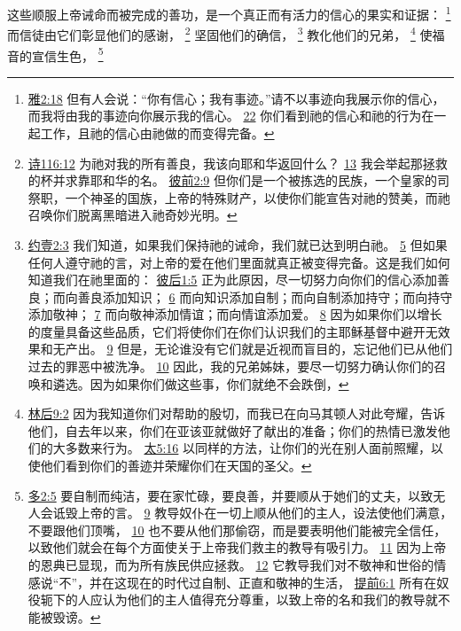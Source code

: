 \documentclass[12pt, a4paper, oneside]{ctexart}
\newcounter{parnum}[section]
\newcommand{\N}{%
   \noindent\refstepcounter{parnum}%
    \makebox[\parindent][l]{\textbf{\arabic{parnum}.}}}
\begin{document}
\N 这些顺服上帝诫命而被完成的善功，是一个真正而有活力的信心的果实和证据：
	\footnote {
		\href{https://biblehub.com/james/2-18.htm}{雅2:18} 但有人会说：“你有信心；我有事迹。”请不以事迹向我展示你的信心，而我将由我的事迹向你展示我的信心。
		\href{https://biblehub.com/james/2-22.htm}{22} 你们看到祂的信心和祂的行为在一起工作，且祂的信心由祂做的而变得完备。
	}
	而信徒由它们彰显他们的感谢，
	\footnote {
		\href{https://biblehub.com/psalms/116-12.htm}{诗116:12} 为祂对我的所有善良，我该向耶和华返回什么？
		\href{https://biblehub.com/psalms/116-13.htm}{13} 我会举起那拯救的杯并求靠耶和华的名。
		\href{https://biblehub.com/1_peter/2-9.htm}{彼前2:9} 但你们是一个被拣选的民族，一个皇家的司祭职，一个神圣的国族，上帝的特殊财产，以使你们能宣告对祂的赞美，而祂召唤你们脱离黑暗进入祂奇妙光明。
	}
	坚固他们的确信，
	\footnote {
		\href{https://biblehub.com/1_john/2-3.htm}{约壹2:3} 我们知道，如果我们保持祂的诫命，我们就已达到明白祂。
		\href{https://biblehub.com/1_john/2-5.htm}{5} 但如果任何人遵守祂的言，对上帝的爱在他们里面就真正被变得完备。这是我们如何知道我们在祂里面的：
		\href{https://biblehub.com/2_peter/1-5.htm}{彼后1:5} 正为此原因，尽一切努力向你们的信心添加善良；而向善良添加知识；
		\href{https://biblehub.com/2_peter/1-6.htm}{6} 而向知识添加自制；而向自制添加持守；而向持守添加敬神；
		\href{https://biblehub.com/2_peter/1-7.htm}{7} 而向敬神添加情谊；而向情谊添加爱。
		\href{https://biblehub.com/2_peter/1-8.htm}{8} 因为如果你们以增长的度量具备这些品质，它们将使你们在你们认识我们的主耶稣基督中避开无效果和无产出。
		\href{https://biblehub.com/2_peter/1-9.htm}{9} 但是，无论谁没有它们就是近视而盲目的，忘记他们已从他们过去的罪恶中被洗净。
		\href{https://biblehub.com/2_peter/1-10.htm}{10} 因此，我的兄弟姊妹，要尽一切努力确认你们的召唤和遴选。因为如果你们做这些事，你们就绝不会跌倒，
	}
	教化他们的兄弟，
	\footnote {
		\href{https://biblehub.com/2_corinthians/9-2.htm}{林后9:2} 因为我知道你们对帮助的殷切，而我已在向马其顿人对此夸耀，告诉他们，自去年以来，你们在亚该亚就做好了献出的准备；你们的热情已激发他们的大多数来行为。
		\href{https://biblehub.com/matthew/5-16.htm}{太5:16} 以同样的方法，让你们的光在别人面前照耀，以使他们看到你们的善迹并荣耀你们在天国的圣父。
	}
	使福音的宣信生色，
	\footnote {
		\href{https://biblehub.com/titus/2-5.htm}{多2:5} 要自制而纯洁，要在家忙碌，要良善，并要顺从于她们的丈夫，以致无人会诋毁上帝的言。
		\href{https://biblehub.com/titus/2-9.htm}{9} 教导奴仆在一切上顺从他们的主人，设法使他们满意，不要跟他们顶嘴，
		\href{https://biblehub.com/titus/2-10.htm}{10} 也不要从他们那偷窃，而是要表明他们能被完全信任，以致他们就会在每个方面使关于上帝我们救主的教导有吸引力。
		\href{https://biblehub.com/titus/2-11.htm}{11} 因为上帝的恩典已显现，而为所有族民供应拯救。
		\href{https://biblehub.com/titus/2-12.htm}{12} 它教导我们对不敬神和世俗的情感说“不”，并在这现在的时代过自制、正直和敬神的生活，
		\href{https://biblehub.com/1_timothy/6-1.htm}{提前6:1} 所有在奴役轭下的人应认为他们的主人值得充分尊重，以致上帝的名和我们的教导就不能被毁谤。
	}
\end{document}
